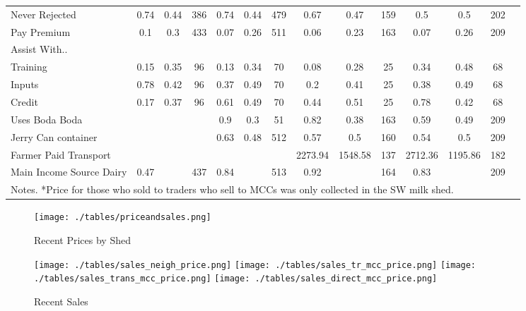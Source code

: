 \documentclass[11pt,letter,draft]{article}
\newcommand{\mcl}{\multicolumn}
\begin{document}
\begin{table}[ht]
{\begin{tabular}{l*{1}{ccccccccccccc}}
Never Rejected  &0.74 &0.44 &         386  &0.74 &0.44 &         479  &0.67 &0.47 &         159  &0.5 &0.5 &         202\\
Pay Premium  &0.1 &0.3 &         433  &0.07 &0.26 &         511  &0.06 &0.23 &         163  &0.07 &0.26 &         209\\
Assist With..\\ 
Training  &0.15 &0.35 &          96 &0.13 &0.34 &          70  &0.08 &0.28 &          25  &0.34 &0.48 &          68\\
Inputs  &0.78 &0.42 &          96  &0.37 &0.49 &          70  &0.2 &0.41 &          25  &0.38 &0.49 &          68\\
Credit  &0.17 &0.37 &          96 &0.61 &0.49 &          70  &0.44 &0.51 &          25  &0.78 &0.42 &          68\\
Uses Boda Boda  & & & &0.9 &0.3 &         51  &0.82 &0.38 &         163 &0.59 &0.49 &         209\\
Jerry Can container  & & & &0.63 &0.48 &         512  &0.57 &0.5 &         160  &0.54 &0.5 &         209\\
Farmer Paid Transport  & & & & & & &2273.94 &1548.58 &         137  &2712.36 &1195.86 &         182\\
Main Income Source Dairy& 0.47& & 437& 0.84& & 513& 0.92& & 164& 0.83& & 209\\

\hline\hline
\mcl{13}{l}{
\footnotesize{
\parbox{20cm}{\vspace{2mm}Notes. *Price for those who sold to traders who sell to MCCs was only collected in the SW milk shed.\baselineskip=11pt}}}%
\end{tabular}
}
\end{table}

\begin{figure}[!th]
\centering
\caption{Recent Prices by Shed}
\label{fig:recentsales}
\texttt{[image: ./tables/priceandsales.png]}
\footnotesize{
\parbox{10cm}{\vspace{2mm}  \baselineskip=11pt}}%
\end{figure}

\begin{figure}[!th]
\centering
\caption{Recent Sales}
\label{fig:pricebysale}
\texttt{[image: ./tables/sales\_neigh\_price.png]}
\texttt{[image: ./tables/sales\_tr\_mcc\_price.png]}
\texttt{[image: ./tables/sales\_trans\_mcc\_price.png]}
\texttt{[image: ./tables/sales\_direct\_mcc\_price.png]}
\footnotesize{
\parbox{10cm}{\vspace{2mm}  \baselineskip=11pt}}%
\end{figure}
\end{document}
